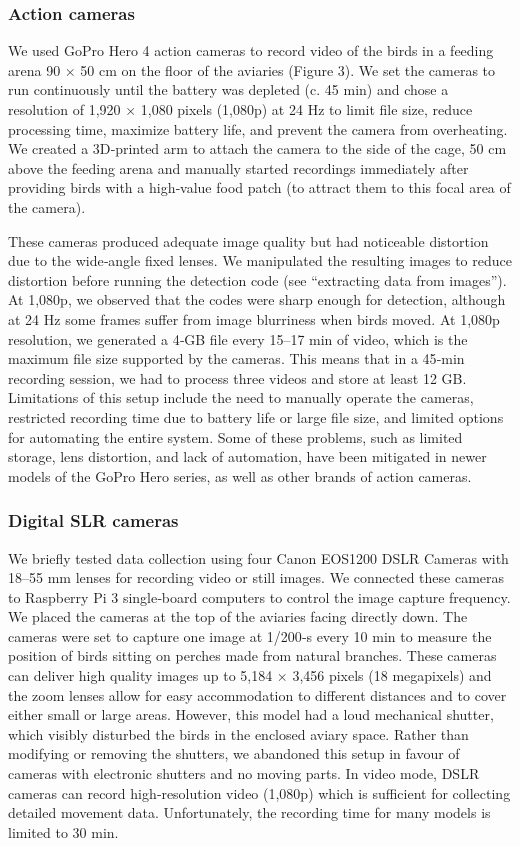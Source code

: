 \documentclass[11pt,a4paper,oneside]{book}
\begin{document}
\subsubsection{Action cameras}
We used GoPro Hero 4 action cameras to record video of the birds in a feeding arena 90 × 50 cm on the floor of the aviaries (Figure 3). We set the cameras to run continuously until the battery was depleted (c. 45 min) and chose a resolution of 1,920 × 1,080 pixels (1,080p) at 24 Hz to limit file size, reduce processing time, maximize battery life, and prevent the camera from overheating. We created a 3D‐printed arm to attach the camera to the side of the cage, 50 cm above the feeding arena and manually started recordings immediately after providing birds with a high‐value food patch (to attract them to this focal area of the camera).

These cameras produced adequate image quality but had noticeable distortion due to the wide‐angle fixed lenses. We manipulated the resulting images to reduce distortion before running the detection code (see “extracting data from images”). At 1,080p, we observed that the codes were sharp enough for detection, although at 24 Hz some frames suffer from image blurriness when birds moved. At 1,080p resolution, we generated a 4‐GB file every 15–17 min of video, which is the maximum file size supported by the cameras. This means that in a 45‐min recording session, we had to process three videos and store at least 12 GB. Limitations of this setup include the need to manually operate the cameras, restricted recording time due to battery life or large file size, and limited options for automating the entire system. Some of these problems, such as limited storage, lens distortion, and lack of automation, have been mitigated in newer models of the GoPro Hero series, as well as other brands of action cameras.

\subsubsection{Digital SLR cameras}
We briefly tested data collection using four Canon EOS1200 DSLR Cameras with 18–55 mm lenses for recording video or still images. We connected these cameras to Raspberry Pi 3 single‐board computers to control the image capture frequency. We placed the cameras at the top of the aviaries facing directly down. The cameras were set to capture one image at 1/200‐s every 10 min to measure the position of birds sitting on perches made from natural branches. These cameras can deliver high quality images up to 5,184 × 3,456 pixels (18 megapixels) and the zoom lenses allow for easy accommodation to different distances and to cover either small or large areas. However, this model had a loud mechanical shutter, which visibly disturbed the birds in the enclosed aviary space. Rather than modifying or removing the shutters, we abandoned this setup in favour of cameras with electronic shutters and no moving parts. In video mode, DSLR cameras can record high‐resolution video (1,080p) which is sufficient for collecting detailed movement data. Unfortunately, the recording time for many models is limited to 30 min.
\end{document}

